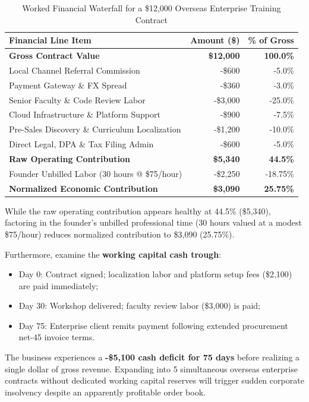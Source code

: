 \begin{table}[htbp]
\centering
\small
\caption{Worked Financial Waterfall for a \$12,000 Overseas Enterprise Training Contract}
\label{tab:contract_waterfall}
\begin{tabularx}{\columnwidth}{p{4.2cm} r r}
\toprule
\textbf{Financial Line Item} & \textbf{Amount (\$)} & \textbf{\% of Gross} \\
\midrule
\textbf{Gross Contract Value} & \textbf{\$12,000} & \textbf{100.0\%} \\
Local Channel Referral Commission & -\$600 & -5.0\% \\
Payment Gateway \& FX Spread & -\$360 & -3.0\% \\
Senior Faculty \& Code Review Labor & -\$3,000 & -25.0\% \\
Cloud Infrastructure \& Platform Support & -\$900 & -7.5\% \\
Pre-Sales Discovery \& Curriculum Localization & -\$1,200 & -10.0\% \\
Direct Legal, DPA \& Tax Filing Admin & -\$600 & -5.0\% \\
\midrule
\textbf{Raw Operating Contribution} & \textbf{\$5,340} & \textbf{44.5\%} \\
Founder Unbilled Labor (30 hours @ \$75/hour) & -\$2,250 & -18.75\% \\
\midrule
\textbf{Normalized Economic Contribution} & \textbf{\$3,090} & \textbf{25.75\%} \\
\bottomrule
\end{tabularx}
\end{table}

While the raw operating contribution appears healthy at 44.5\% (\$5,340), factoring in the founder's unbilled professional time (30 hours valued at a modest \$75/hour) reduces normalized contribution to \$3,090 (25.75\%). 

Furthermore, examine the \textbf{working capital cash trough}:
\begin{itemize}
    \item Day 0: Contract signed; localization labor and platform setup fees (\$2,100) are paid immediately;
    \item Day 30: Workshop delivered; faculty review labor (\$3,000) is paid;
    \item Day 75: Enterprise client remits payment following extended procurement net-45 invoice terms.
\end{itemize}
The business experiences a \textbf{-\$5,100 cash deficit for 75 days} before realizing a single dollar of gross revenue. Expanding into 5 simultaneous overseas enterprise contracts without dedicated working capital reserves will trigger sudden corporate insolvency despite an apparently profitable order book.

